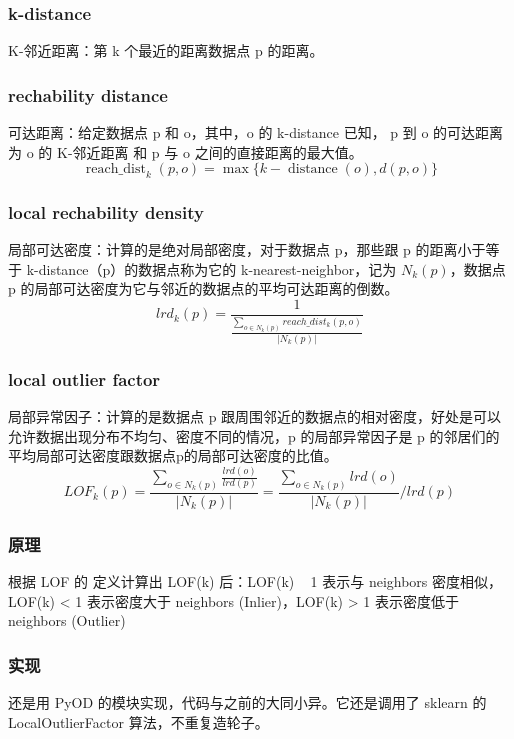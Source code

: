 \documentclass[UTF8]{ctexart}
\begin{document}
        \subsubsection{k-distance}
            K-邻近距离：第 k 个最近的距离数据点 p 的距离。

        \subsubsection{rechability distance}
            可达距离：给定数据点 p 和 o，其中，o 的 k-distance 已知， p 到 o 的可达距离为 o 的 K-邻近距离 和 p 与 o 之间的直接距离的最大值。 $$ \operatorname {reach\_dist}_{k}(p, o)=\max \{k-\operatorname {distance}(o), d(p, o)\} $$

        \subsubsection{local rechability density}
            局部可达密度：计算的是绝对局部密度，对于数据点 p，那些跟 p 的距离小于等于 k-distance（p）的数据点称为它的 k-nearest-neighbor，记为 $N_k(p)$，数据点 p 的局部可达密度为它与邻近的数据点的平均可达距离的倒数。 $$ lrd_{k}(p)=\frac{1}{\frac{\sum_{o\in{N_{k}(p)}}reach\_dist_k(p,o)}{|N_k(p)|}} $$

        \subsubsection{local outlier factor}
            局部异常因子：计算的是数据点 p 跟周围邻近的数据点的相对密度，好处是可以允许数据出现分布不均匀、密度不同的情况，p 的局部异常因子是 p 的邻居们的平均局部可达密度跟数据点p的局部可达密度的比值。$$ LOF_{k}(p)=\frac{\sum_{o\in{N_k(p)}}\frac{lrd(o)}{lrd(p)}}{|N_{k}(p)|}=\frac{\sum_{o\in{N_{k}(p)}}lrd(o)}{|N_{k}(p)|}/lrd(p) $$

        \subsubsection{原理}
            根据 LOF 的 定义计算出 LOF(k) 后：LOF(k) ~ 1 表示与 neighbors 密度相似，LOF(k) < 1 表示密度大于 neighbors (Inlier)，LOF(k) > 1 表示密度低于 neighbors (Outlier)

        \subsubsection{实现}
            还是用 PyOD 的模块实现，代码与之前的大同小异。它还是调用了 sklearn 的 LocalOutlierFactor 算法，不重复造轮子。
\end{document}
